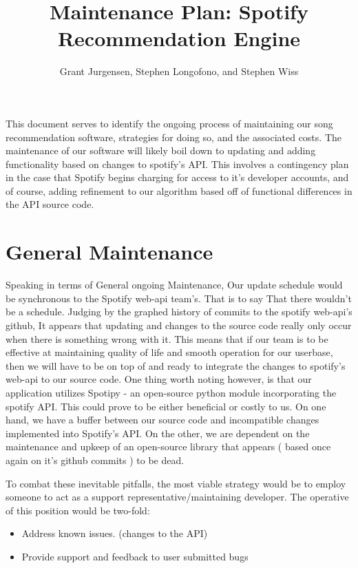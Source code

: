 \documentclass{roffin}
\begin{document}
\title{Maintenance Plan: Spotify Recommendation Engine}

\author{Grant Jurgensen, Stephen Longofono, and Stephen Wiss}

\maketitle
This document serves to identify the ongoing process of maintaining our song recommendation software, strategies for doing so, and the associated costs. The maintenance of our software will likely boil down to updating and adding functionality based on changes to spotify's API. This involves a contingency plan in the case that Spotify begins charging for access to it's developer  accounts, and of course, adding refinement to our algorithm based off of functional differences in the API source code. 


\section{General Maintenance}


Speaking in terms of General ongoing Maintenance, Our update schedule would be synchronous to the Spotify web-api team's. That is to say That there wouldn't be a schedule. Judging by the graphed history of commits to the spotify web-api's github, It appears that updating and changes to the source code really only occur when there is something wrong with it. This means that if our team is to be effective at maintaining quality of life and smooth operation for our userbase, then we will have to be on top of and ready to integrate the changes to spotify's web-api to our source code. One thing worth noting however, is that our application utilizes Spotipy - an open-source python module incorporating the spotify API. This could prove to be either beneficial or costly to us. On one hand, we have a buffer between our source code and incompatible changes implemented into Spotify's API. On the other, we are dependent on the maintenance and upkeep of an open-source library that appears ( based once again on it's github commits ) to be dead. 

To combat these inevitable pitfalls, the most viable strategy would be to employ someone to act as a support representative/maintaining developer. The operative of this position would be two-fold:
    \begin{itemize}
        \item Address known issues. (changes to the API) 
        \item Provide support and feedback to user submitted bugs
    \end{itemize}
\end{document}
